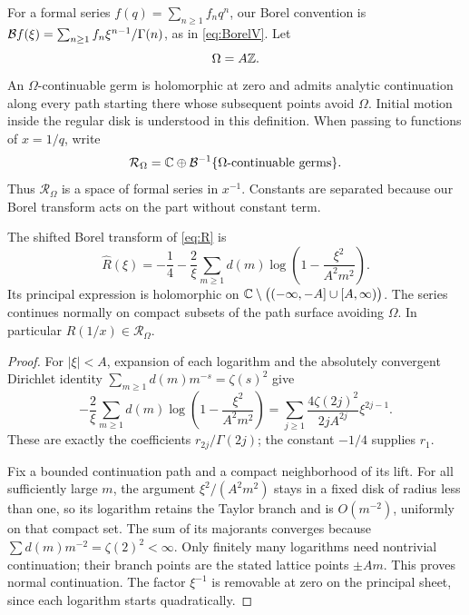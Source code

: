 For a formal series $f(q)=\sum_{n\ge1}f_nq^n$, our Borel convention is
$\mathcal B f(\xi)=\sum_{n\ge1}f_n\xi^{n-1}/\Gamma(n)$, as in
\eqref{eq:BorelV}. Let
\[
 \Omega=A\mathbb Z.
\]
An $\Omega$-continuable germ is holomorphic at zero and admits analytic
continuation along every path starting there whose subsequent points avoid
$\Omega$. Initial motion inside the regular disk is understood in this
definition. When passing to functions of $x=1/q$, write
\[
 \mathcal R_\Omega
 =\mathbb C\oplus\mathcal B^{-1}
     \{\text{$\Omega$-continuable germs}\}.
\]
Thus $\mathcal R_\Omega$ is a space of formal series in $x^{-1}$.
Constants are separated because our Borel transform acts on the part
without constant term.

\begin{proposition}
\label{prop:forward-Borel}
The shifted Borel transform of \eqref{eq:R} is
\begin{equation}\label{eq:R-Borel-lattice}
 \widehat R(\xi)
 =-\frac14-\frac2\xi
       \sum_{m\ge1}d(m)
           \log\left(1-\frac{\xi^2}{A^2m^2}\right).
\end{equation}
Its principal expression is holomorphic on
$\mathbb C\setminus\bigl((-\infty,-A]\cup[A,\infty)\bigr)$.
The series continues normally on compact subsets of the path surface
avoiding $\Omega$. In particular $R(1/x)\in\mathcal R_\Omega$.
\end{proposition}
\begin{proof}
For $|\xi|<A$, expansion of each logarithm and the absolutely convergent
Dirichlet identity $\sum_{m\ge1}d(m)m^{-s}=\zeta(s)^2$ give
\[
 -\frac2\xi\sum_{m\ge1}d(m)
       \log\left(1-\frac{\xi^2}{A^2m^2}\right)
 =\sum_{j\ge1}\frac{4\zeta(2j)^2}{2jA^{2j}}\xi^{2j-1}.
\]
These are exactly the coefficients $r_{2j}/\Gamma(2j)$; the constant
$-1/4$ supplies $r_1$.

Fix a bounded continuation path and a compact neighborhood of its lift.
For all sufficiently large $m$, the argument
$\xi^2/(A^2m^2)$ stays in a fixed disk of radius less than one, so its
logarithm retains the Taylor branch and is $O(m^{-2})$, uniformly on that
compact set. The sum of its majorants converges because
$\sum d(m)m^{-2}=\zeta(2)^2<\infty$. Only finitely many logarithms need
nontrivial continuation; their branch points are the stated lattice points
$\pm Am$. This proves normal continuation. The factor $\xi^{-1}$ is
removable at zero on the principal sheet, since each logarithm starts
quadratically.
\end{proof}

